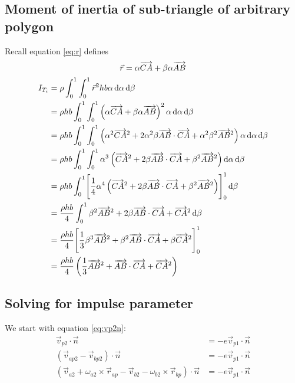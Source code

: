 \subsection{Moment of inertia of sub-triangle of arbitrary polygon} Recall
equation \ref{eq:r} defines
$$ \vec r = \alpha \overrightarrow{CA} + \beta \alpha \overrightarrow{AB} $$
\begin{equation}
	\label{eq:subtriangle_arbitrary_moment_long}
	\begin{split}
		I_{T_i} &= \rho \int_0^1 \int_0^1 \vec r^2 hb \alpha  \diff \alpha \diff \beta\\
		&=\rho hb\int_0^1 \int_0^1 \left(\alpha \vv{CA} + \beta \alpha \vv{AB}\right)^2 \alpha  \diff \alpha \diff \beta\\
		&=\rho hb\int_0^1 \int_0^1 \left(\alpha^2 \vv{CA}^2 + 2 \alpha^2 \beta \vv{AB} \cdot \vv{CA} + \alpha^2 \beta^2 \vv{AB}^2\right) \alpha  \diff \alpha \diff \beta\\
		&=\rho hb\int_0^1 \int_0^1 \alpha^3 \left(\vv{CA}^2 + 2 \beta \vv{AB} \cdot \vv{CA} + \beta^2 \vv{AB}^2\right) \diff \alpha \diff \beta\\
		&=\rho hb\int_0^1 \Biggl[\frac{1}{4} \alpha^4 \left(\vv{CA}^2 + 2 \beta \vv{AB} \cdot \vv{CA} + \beta^2 \vv{AB}^2\right) \Biggr]_0^1\diff \beta\\
		&= \frac{\rho hb}{4}\int_0^1 \beta^2 \vv{AB}^2 + 2 \beta \vv{AB} \cdot \vv{CA} + \vv{CA}^2 \diff \beta\\
		&= \frac{\rho hb}{4} \Biggl[\frac{1}{3} \beta^3 \vv{AB}^2 + \beta^2 \vv{AB} \cdot \vv{CA} + \beta\vv{CA}^2 \Biggr]_0^1\\
		&= \frac{\rho hb}{4} \left(\frac{1}{3}\vv{AB}^2 + \vv{AB} \cdot \vv{CA} + \vv{CA}^2\right) \\
	\end{split}
\end{equation}

\newpage
\subsection{Solving for impulse parameter}
\label{app:impulse_long}
We start with equation \ref{eq:vp2n}:
\begin{equation*}
	\begin{split}
		\vec v_{p2} \cdot \vec n &= - e \vec v_{p1} \cdot \vec n\\
		\left(\vec v_{ap2} - \vec v_{bp2}\right)\cdot \vec n &= - e \vec v_{p1} \cdot \vec n\\
		\left( \vec v_{a2} + \omega_{a2} \times \vec r_{ap} - \vec v_{b2} - \omega_{b2} \times \vec r_{bp}
		\right)\cdot \vec n &= - e \vec v_{p1} \cdot \vec n\\
	\end{split}
\end{equation*}

